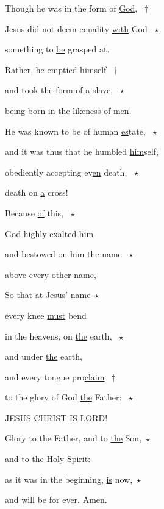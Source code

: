 \noindent Though he was in the form of \uline{God}, ~†~\nopagebreak

Jesus did not deem equality \uline{with} God ~$\star$~\nopagebreak

something to \uline{be} grasped at.

\noindent Rather, he emptied him\uline{self} ~†~\nopagebreak

and took the form of \uline{a} slave, ~$\star$~\nopagebreak

being born in the likeness \uline{of} men.

\noindent He was known to be of human \uline{es}tate, ~$\star$~\nopagebreak

and it was thus that he humbled \uline{him}self,

\noindent obediently accepting ev\uline{en} death, ~$\star$~\nopagebreak

death on \uline{a} cross!

\noindent Because \uline{of} this, ~$\star$~\nopagebreak

God highly \uline{ex}alted him

\noindent and bestowed on him \uline{the} name ~$\star$~\nopagebreak

above every oth\uline{er} name,

\noindent So that at Je\uline{sus}’ name~$\star$~\nopagebreak

every knee \uline{must} bend

\noindent in the heavens, on \uline{the} earth, ~$\star$~\nopagebreak

and under \uline{the} earth,

\noindent and every tongue pro\uline{claim} ~†~\nopagebreak

to the glory of God \uline{the} Father: ~$\star$~\nopagebreak

JESUS CHRIST \uline{IS} LORD!

\noindent Glory to the Father, and to \uline{the} Son,~$\star$~\nopagebreak

and to the Ho\uline{ly} Spirit:

\noindent as it was in the beginning, \uline{is} now,~$\star$~\nopagebreak

and will be for ever. \uline{A}men.
